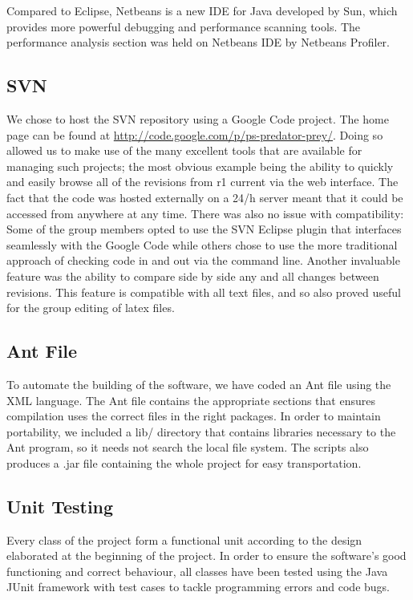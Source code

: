 \documentclass[11pt]{report}
\begin{document}
Compared to Eclipse, Netbeans is a new IDE for Java developed by Sun, which provides more powerful debugging and performance scanning tools. The performance analysis section was held on Netbeans IDE by Netbeans Profiler.  
     
     
      \subsection{SVN} %
      
	We chose to host the SVN repository using a Google Code project. The home page can be found at \href{http://code.google.com/p/ps-predator-prey/}{http://code.google.com/p/ps-predator-prey/}. Doing so allowed us to make use of the many excellent tools that are available for managing such projects; the most obvious example being the ability to quickly and easily browse all of the revisions from r1 current via the web interface.  The fact that the code was hosted externally on a 24/h server meant that it could be accessed from anywhere at any time. There was also no issue with compatibility: Some of the group members opted to use the SVN Eclipse plugin that interfaces seamlessly with the Google Code while others chose to use the more traditional approach of checking code in and out via the command line. Another invaluable feature was the ability to compare side by side any and all changes between revisions. 
	 This feature is compatible with all text files, and so also proved useful for the group editing of latex files.	   
 
      
      \subsection{Ant File} %
To automate the building of the software, we have coded an Ant file using the XML language. The Ant file contains the appropriate sections that ensures compilation uses the correct files in the right packages. In order to maintain portability, we included a lib/ directory that contains libraries necessary to the Ant program, so it needs not search the local file system. The scripts also produces a .jar file containing the whole project for easy transportation.  
 
      \subsection{Unit Testing} %
      Every class of the project form a functional unit according to the design elaborated at the beginning of the project. In order to ensure the software's good functioning and correct behaviour, all classes have been tested using the Java JUnit framework with test cases to tackle programming errors and code bugs.
\end{document}
